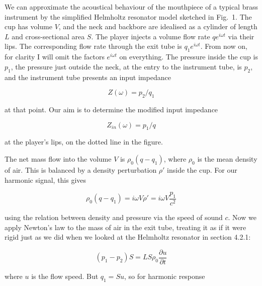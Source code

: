   We can approximate the acoustical behaviour of the mouthpiece of a typical 
  brass instrument by the simplified Helmholtz resonator model sketched in 
  Fig.\ 1. The cup has volume $V$, and the neck and backbore are idealised as a 
  cylinder of length $L$ and cross-sectional area $S$. The player injects a 
  volume flow rate $qe^{i \omega t}$ via their lips. The corresponding flow 
  rate through the exit tube is $q_1e^{i \omega t}$. From now on, for clarity I 
  will omit the factors $e^{i \omega t}$ on everything. The pressure inside the 
  cup is $p_1$, the pressure just outside the neck, at the entry to the 
  instrument tube, is $p_2$, and the instrument tube presents an input 
  impedance 

  \begin{equation*}Z(\omega)=p_2/q_1 \tag{1}\end{equation*} 

  \noindent{}at that point. Our aim is to determine the modified input 
  impedance 

  \begin{equation*}Z_{in}(\omega)=p_1/q \tag{2}\end{equation*} 

  \noindent{}at the player's lips, on the dotted line in the figure. 


  The net mass flow into the volume $V$ is $\rho_0 (q-q_1)$, where $\rho_0$ is 
  the mean density of air. This is balanced by a density perturbation $\rho'$ 
  inside the cup. For our harmonic signal, this gives 

  \begin{equation*}\rho_0(q-q_1)=i \omega V \rho' = i \omega V \dfrac{p_1}{c^2} 
  \tag{3}\end{equation*} 

  \noindent{}using the relation between density and pressure via the speed of 
  sound $c$. Now we apply Newton's law to the mass of air in the exit tube, 
  treating it as if it were rigid just as we did when we looked at the 
  Helmholtz resonator in section 4.2.1: 

  \begin{equation*}(p_1-p_2) S = L S \rho_0 \dfrac{\partial u}{\partial t} 
  \tag{4}\end{equation*} 

  \noindent{}where $u$ is the flow speed. But $q_1 = Su$, so for harmonic 
  response 

